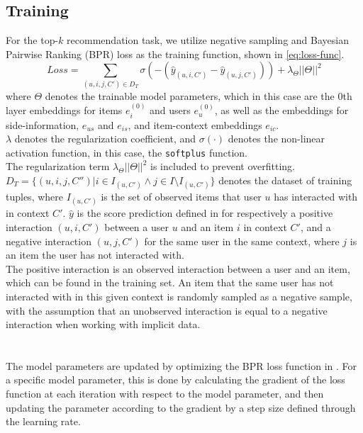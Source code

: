 \subsection{Training}\label{subsec:csgcn_is_training}
For the top-$k$ recommendation task, we utilize negative sampling and Bayesian Pairwise Ranking (BPR) loss \cite{BPR} as the training function, shown in \autoref{eq:loss-func}.
\begin{equation}\label{eq:loss-func}
    Loss = \sum_{(u,i,j,C') \in D_T} \sigma(-(\hat{y}_{(u,i,C')} - \hat{y}_{(u,j,C')})) + \lambda_\Theta ||\Theta||^2
\end{equation}
where $\Theta$ denotes the trainable model parameters, which in this case are the 0th layer embeddings for items $e_{i}^{(0)}$ and users $e_{u}^{(0)}$, as well as the embeddings for side-information, $e_{us}$ and $e_{is}$, and item-context embeddings $e_{ic}$.\\
$\lambda$ denotes the regularization coefficient, and $\sigma(\cdot)$ denotes the non-linear activation function, in this case, the \texttt{softplus} function.\\
The regularization term $\lambda_\Theta ||\Theta||^2$ is included to prevent overfitting.\\
$D_T = \{(u,i,j,C'') | i \in I_{(u,C')} \wedge  j \in I \setminus I_{(u,C')}\}$ denotes the dataset of training tuples, where $I_{(u,C')}$ is the set of observed items that user $u$ has interacted with in context $C'$.
$\hat{y}$ is the score prediction defined in  for respectively a positive interaction $(u,i,C')$ between a user $u$ and an item $i$ in context $C'$, and a negative interaction $(u,j,C')$ for the same user in the same context, where $j$ is an item the user has not interacted with.\\
The positive interaction is an observed interaction between a user and an item, which can be found in the training set.
An item that the same user has not interacted with in this given context is randomly sampled as a negative sample, with the assumption that an unobserved interaction is equal to a negative interaction when working with implicit data.\\
\\\\
The model parameters are updated by optimizing the BPR loss function in .
For a specific model parameter, this is done by calculating the gradient of the loss function at each iteration with respect to the model parameter, and then updating the parameter according to the gradient by a step size defined through the learning rate.
